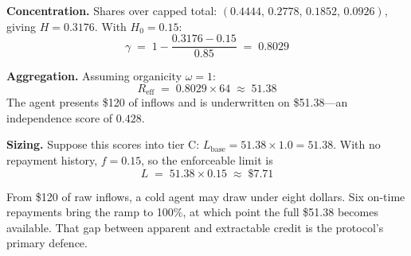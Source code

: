 \documentclass[11pt,a4paper]{article}
\begin{document}
\textbf{Concentration.} Shares over capped total:
$(0.4444,\, 0.2778,\, 0.1852,\, 0.0926)$, giving $H = 0.3176$. With $H_0 = 0.15$:
\[
\gamma \;=\; 1 - \frac{0.3176 - 0.15}{0.85} \;=\; 0.8029
\]

\textbf{Aggregation.} Assuming organicity $\omega = 1$:
\[
R_{\mathrm{eff}} \;=\; 0.8029 \times 64 \;\approx\; 51.38
\]
The agent presents \$120 of inflows and is underwritten on \$51.38---an
independence score of $0.428$.

\textbf{Sizing.} Suppose this scores into tier C:
$L_{\mathrm{base}} = 51.38 \times 1.0 = 51.38$. With no repayment history,
$f = 0.15$, so the enforceable limit is
\[
L \;=\; 51.38 \times 0.15 \;\approx\; \$7.71
\]

From \$120 of raw inflows, a cold agent may draw under eight dollars. Six on-time
repayments bring the ramp to 100\%, at which point the full \$51.38 becomes
available. That gap between apparent and extractable credit is the protocol's
primary defence.
\end{document}
